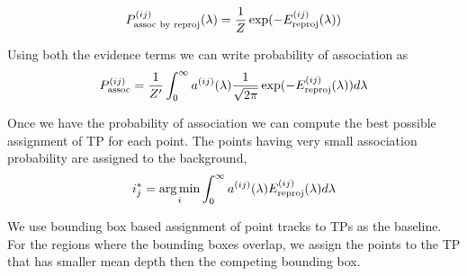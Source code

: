 \begin{align}
  P^{(ij)}_{\text{assoc by reproj}}(\lambda) = \frac{1}{Z}\exp(-E^{(ij)}_{\text{reproj}}(\lambda))
\end{align}

Using both the evidence terms we can write probability of association as
\begin{align}
  P^{(ij)}_{\text{assoc}} = \frac{1}{Z'}\int_0^{\infty} a^{(ij)}(\lambda) \frac{1}{\sqrt{2\pi}}\exp(-E^{(ij)}_{\text{reproj}}(\lambda))d\lambda
  \label{eq:prob-assoc}
\end{align}

Once we have the probability of association we can compute the best possible
assignment of TP for each point. The points having very small association
probability are assigned to the background,
\begin{align}
  i^*_{j} = \operatorname*{\arg\min}_{i} \int_0^\infty a^{(ij)}(\lambda) E^{(ij)}_{\text{reproj}}(\lambda) d\lambda
\end{align}

We use bounding box based assignment of point tracks to TPs as the baseline.
For the regions where the bounding boxes overlap, we assign the points to the
TP that has smaller mean depth then the competing bounding box.

